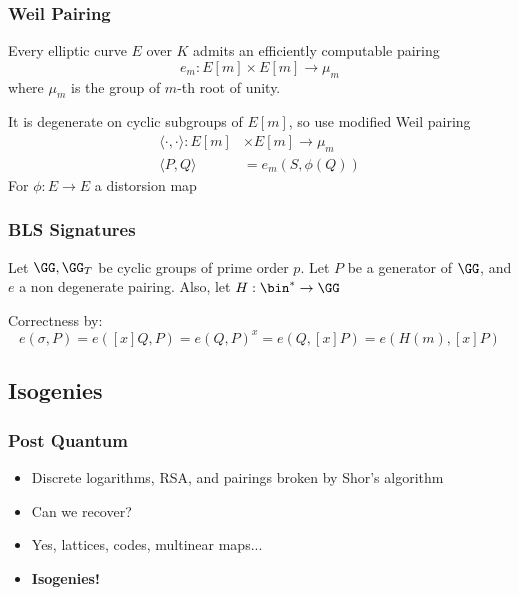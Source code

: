 \documentclass{beamer}
\begin{document}
\begin{frame}
    \frametitle{Weil Pairing}
    Every elliptic curve $E$ over $K$ admits an efficiently computable pairing
    \[ e_m : E[m] \times E[m] \to \mu_m \]
    where $\mu_m$ is the group of $m$-th root of unity. 

    \pause
    It is degenerate on cyclic subgroups of $E[m]$, so use modified Weil pairing
    \begin{align*}
        \langle \cdot , \cdot \rangle : E[m] &\times E[m] \to \mu_m \\
        \langle P, Q \rangle &= e_m(S, \phi(Q))
    \end{align*}
    For $\phi: E \to E$ a distorsion map

\end{frame}

\begin{frame}
    \frametitle{BLS Signatures}
    Let $\GG, \GG_T$ be cyclic groups of prime order $p$. Let $P$ be a generator of $\GG$, and $e$ a non degenerate pairing.
    Also, let $H: \bin^* \to \GG$
    \begin{center}
    \pause
    \begin{pcvstack}
        \begin{pchstack}
        \pause
        \end{pchstack}

        \pause
    \end{pcvstack}
    \end{center}
    \pause
    Correctness by:
    \[ e(\sigma, P) = e([x]Q, P) = e(Q, P)^x = e(Q, [x]P) = e(H(m), [x]P) \]
 
\end{frame}

\subsection{Isogenies}
\begin{frame}
    \frametitle{Post Quantum}
    \begin{itemize}
        \item<1-> Discrete logarithms, RSA, and pairings broken by Shor's algorithm
        \item<2-> Can we recover?
        \item<3-> Yes, lattices, codes, multinear maps...
        \item<4-> \textbf{Isogenies!}
    \end{itemize}
\end{frame}
\end{document}

